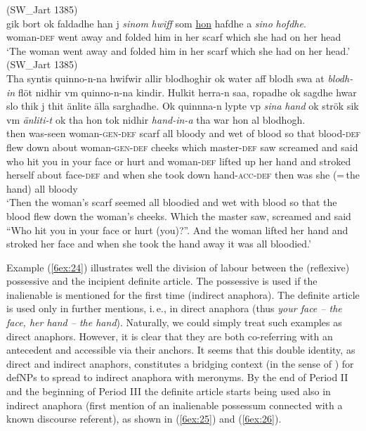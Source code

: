 \documentclass[output=paper]{langsci/langscibook}
\begin{document}
\begin{exe}
\ex\label{6ex:23}
(SW\_Jart 1385)\\
 gik bort ok faldadhe han j {\emph{sinom}} {\emph{hwiff}} som {\ul{hon}} hafdhe a {\emph{sino}} {\emph{hofdhe}}. \\
woman-{\textsc{def}} went away and folded him in her scarf which she had on her head \\
\glt `The woman went away and folded him in her scarf which she had on her head.'
\newpage
\ex\label{6ex:24}
(SW\_Jart 1385)\\
\gll Tha syntis quinno-n-na hwifwir allir blodhoghir ok water aff blodh swa at {\emph{blodh-in}} flöt nidhir vm quinno-n-na kindir. Hulkit herra-n saa, ropadhe ok sagdhe hwar slo thik j thit änlite älla sarghadhe. Ok quinnna-n lypte vp {\emph{sina}} {\emph{hand}} ok strök sik vm {\emph{änliti-t}} ok tha hon tok nidhir {\emph{hand-in-a}} tha war hon al blodhogh. \\
%
then was-seen woman-{\textsc{gen-def}} scarf all bloody and wet of blood so that blood-{\textsc{def}} flew down about woman-{\textsc{gen-def}} cheeks which master-{\textsc{def}} saw screamed and said who hit you in your face or hurt and woman-{\textsc{def}} lifted up her hand and stroked herself about face-{\textsc{def}} and when she took down hand-{\textsc{acc-def}} then was {she (=\,the hand)} all bloody \\
\glt 
{`Then the woman's scarf seemed all bloodied and wet with blood so that the blood flew down the woman's cheeks. Which the master saw, screamed and said ``Who hit you in your face or hurt (you)?''. And the woman lifted her hand and stroked her face and when she took the hand away it was all bloodied.'}
\end{exe}

Example (\ref{6ex:24}) illustrates well the division of labour between the (reflexive) possessive and the incipient definite article. The possessive is used if the inalienable is mentioned for the first time (indirect anaphora). The definite article is used only in further mentions, i.\,e., in direct anaphora (thus {\emph{your face -- the face, her hand -- the hand}}). Naturally, we could simply treat such examples as direct anaphors. However, it is clear that they are both co-referring with an antecedent and accessible via their anchors. It seems that this double identity, as direct and indirect anaphors, constitutes a bridging context (in the sense of \citealt{heine:02}) for defNPs to spread to indirect anaphora with meronyms. By the end of Period II and the beginning of Period III the definite article starts being used also in indirect anaphora (first mention of an inalienable possessum connected with a known discourse referent), as shown in (\ref{6ex:25}) and (\ref{6ex:26}).
\largerpage
\end{document}
